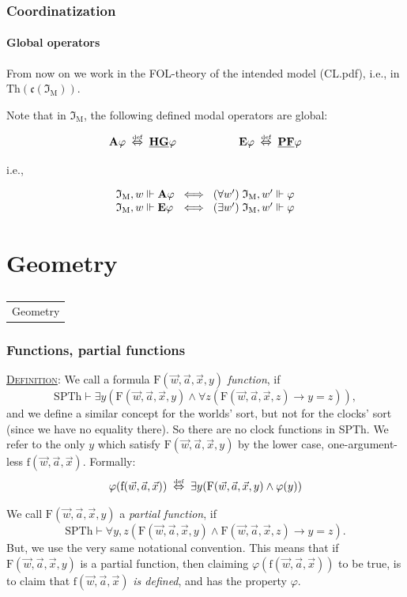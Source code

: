 \documentclass[xcolor=x11names]{beamer}
\makeatletter
\let\beamer@writeslidentry@miniframeson=\beamer@writeslidentry
\def\beamer@writeslidentry@miniframesoff{%
  \expandafter\beamer@ifempty\expandafter{\beamer@framestartpage}{}%
  {%
    \clearpage\beamer@notesactions%
  }
}
\newcommand*{\miniframeson}{\let\beamer@writeslidentry=\beamer@writeslidentry@miniframeson}
\newcommand*{\miniframesoff}{\let\beamer@writeslidentry=\beamer@writeslidentry@miniframesoff}
\newcommand{\cimdia}[1] {\miniframesoff \begin{frame}\begin{center}\huge \begin{tabular}{c}#1\end{tabular}\end{center}\end{frame}\miniframeson}
\newcommand{\szakasz}[2][]{\section{#1}\subsection{}\cimdia{#2}}
\newcommand{\dzsa}[1]{\textsc{\underline{#1}}:}
\newcommand{\GB}{\mathbf A}
\newcommand{\GD}{\mathbf E}
\newcommand{\FDDot}{\underline{\mathbf F}}
\newcommand{\FBDot}{\underline{\mathbf G}}
\newcommand{\PDDot}{\underline{\mathbf P}}
\newcommand{\PBDot}{\underline{\mathbf H}}
\newcommand{\defekv}[1][.1]{\hspace{#1cm}\overset{\textup{\tiny def}}{ \Leftrightarrow }\hspace{#1cm}}
\newcommand{\lthen}{\rightarrow}
\newcommand{\forallp}[1]{(\forall #1)}
\newcommand{\existsp}[1]{(\exists #1)}
\newenvironment{tomb}[2][.1]{\arraycolsep=#1cm\begin{array}{#2}}{\end{array}}
\makeatother
\begin{document}
\begin{frame}[t]
\frametitle{Coordinatization}
\framesubtitle{Global operators}
\footnotesize
From now on we work in the FOL-theory of the intended model (CL.pdf), i.e., in $\mathrm{Th}(\mathfrak c(\mathfrak I_{\mathrm{M}}))$.

Note that in $\mathfrak I_{\mathrm{M}}$, the following defined modal operators are global:

\[ \GB \varphi \defekv \PBDot \FBDot \varphi \hspace{2cm} \GD \varphi \defekv \PDDot \FDDot \varphi \]

i.e.,

\[\begin{tomb}{lcl}
   \mathfrak I_{\mathrm{M}},w \Vdash \GB \varphi &\iff& \forallp {w'}\; \mathfrak I_{\mathrm{M}},w'\Vdash \varphi
\\ \mathfrak I_{\mathrm{M}},w \Vdash \GD \varphi &\iff& \existsp {w'}\; \mathfrak I_{\mathrm{M}},w'\Vdash \varphi  \end{tomb}\]
\end{frame}

\szakasz[Geometry]{Geometry}

\begin{frame}[t]
\frametitle{Functions, partial functions}
\footnotesize

\dzsa{Definition} We call a formula $\mathrm{F}(\vec w, \vec a,\vec x, y)$ \emph{function}, if
\[ \mathrm{SPTh} \vdash \exists y (\mathrm{F}(\vec w, \vec a,\vec x, y ) \land \forall z (\mathrm{F}(\vec w, \vec a,\vec x, z)\lthen y=z)), \]
and we define a similar concept for the worlds' sort, but not for the clocks' sort (since we have no equality there). So there are no clock functions in SPTh.  We refer to the only $y$ which satisfy $\mathrm{F}(\vec w, \vec a,\vec x, y)$ by the lower case, one-argument-less $\mathrm{f}(\vec w, \vec a,\vec x)$. Formally:
\[\varphi (\mathrm{f}(\vec w, \vec a,\vec x)) \defekv \exists y (\mathrm{F}(\vec w, \vec a,\vec x, y)\land \varphi (y))\]

We call $\mathrm{F}(\vec w, \vec a,\vec x, y )$ a \emph{partial function}, if
\[ \mathrm{SPTh} \vdash \forall y,z (\mathrm{F}(\vec w, \vec a,\vec x, y) \land \mathrm{F}(\vec w, \vec a,\vec x, z)\lthen y=z). \]
But, we use the very same notational convention. This means that if $\mathrm{F}(\vec w, \vec a,\vec x, y )$ is a partial function, then claiming $\varphi(\mathrm{f}(\vec w, \vec a,\vec x))$ to be true, is to claim that $\mathrm{f}(\vec w, \vec a,\vec x)$ \emph{is defined}, and has the property $\varphi$.

\end{frame}
\end{document}
